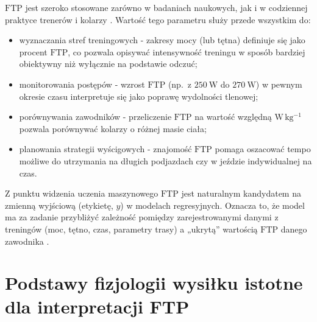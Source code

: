 $\mathrm{FTP}$ jest szeroko stosowane zarówno w badaniach naukowych, jak i w codziennej praktyce trenerów i kolarzy \parencite{borszcz2018ftp,allen2019power,karsten2021cpftp,denham2020predictftp}.
Wartość tego parametru służy przede wszystkim do:
\begin{itemize}
  \item wyznaczania stref treningowych - zakresy mocy (lub tętna) definiuje się jako procent $\mathrm{FTP}$, co pozwala opisywać intensywność treningu w sposób bardziej obiektywny niż wyłącznie na podstawie odczuć;
  \item monitorowania postępów - wzrost $\mathrm{FTP}$ (np.\ z $250\ \mathrm{W}$ do $270\ \mathrm{W}$) w pewnym okresie czasu interpretuje się jako poprawę wydolności tlenowej;
  \item porównywania zawodników - przeliczenie $\mathrm{FTP}$ na wartość względną $\mathrm{W\,kg^{-1}}$ pozwala porównywać kolarzy o różnej masie ciała;
  \item planowania strategii wyścigowych - znajomość $\mathrm{FTP}$ pomaga oszacować tempo możliwe do utrzymania na długich podjazdach czy w jeździe indywidualnej na czas.
\end{itemize}

Z punktu widzenia uczenia maszynowego $\mathrm{FTP}$ jest naturalnym kandydatem na zmienną wyjściową (etykietę, $y$) w modelach regresyjnych.
Oznacza to, że model ma za zadanie przybliżyć zależność pomiędzy zarejestrowanymi danymi z treningów (moc, tętno, czas, parametry trasy) a „ukrytą” wartością $\mathrm{FTP}$ danego zawodnika \parencite{stockwell2023mlftp,denham2020predictftp}.

\section{Podstawy fizjologii wysiłku istotne dla interpretacji FTP}

